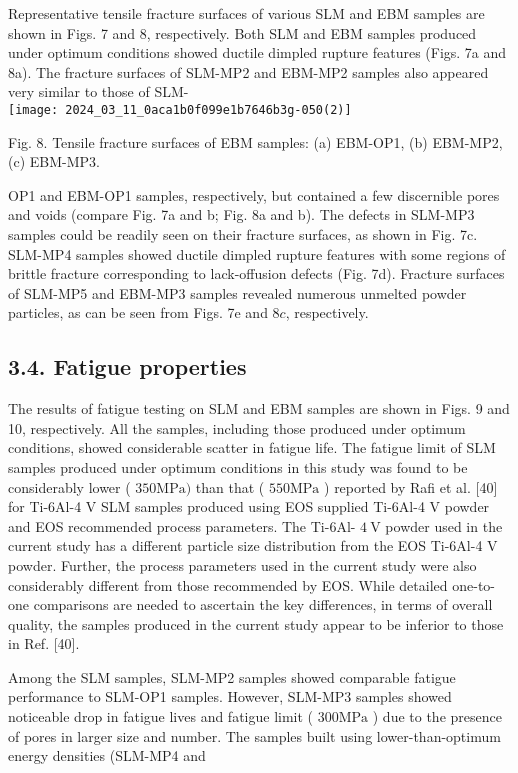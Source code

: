 \documentclass[10pt]{article}
\begin{document}
Representative tensile fracture surfaces of various SLM and EBM samples are shown in Figs. 7 and 8, respectively. Both SLM and EBM samples produced under optimum conditions showed ductile dimpled rupture features (Figs. 7a and 8a). The fracture surfaces of SLM-MP2 and EBM-MP2 samples also appeared very similar to those of SLM-\\
\texttt{[image: 2024\_03\_11\_0aca1b0f099e1b7646b3g-050(2)]}

Fig. 8. Tensile fracture surfaces of EBM samples: (a) EBM-OP1, (b) EBM-MP2, (c) EBM-MP3.

OP1 and EBM-OP1 samples, respectively, but contained a few discernible pores and voids (compare Fig. 7a and b; Fig. 8a and b). The defects in SLM-MP3 samples could be readily seen on their fracture surfaces, as shown in Fig. 7c. SLM-MP4 samples showed ductile dimpled rupture features with some regions of brittle fracture corresponding to lack-offusion defects (Fig. 7d). Fracture surfaces of SLM-MP5 and EBM-MP3 samples revealed numerous unmelted powder particles, as can be seen from Figs. 7e and $8 c$, respectively.

\subsection*{3.4. Fatigue properties}
The results of fatigue testing on SLM and EBM samples are shown in Figs. 9 and 10, respectively. All the samples, including those produced under optimum conditions, showed considerable scatter in fatigue life. The fatigue limit of SLM samples produced under optimum conditions in this study was found to be considerably lower ( $350 \mathrm{MPa})$ than that ( $550 \mathrm{MPa}$ ) reported by Rafi et al. [40] for Ti-6Al-4 V SLM samples produced using EOS supplied Ti-6Al-4 V powder and EOS recommended process parameters. The Ti-6Al- $4 \mathrm{~V}$ powder used in the current study has a different particle size distribution from the EOS Ti-6Al-4 V powder. Further, the process parameters used in the current study were also considerably different from those recommended by EOS. While detailed one-to-one comparisons are needed to ascertain the key differences, in terms of overall quality, the samples produced in the current study appear to be inferior to those in Ref. [40].

Among the SLM samples, SLM-MP2 samples showed comparable fatigue performance to SLM-OP1 samples. However, SLM-MP3 samples showed noticeable drop in fatigue lives and fatigue limit ( $300 \mathrm{MPa}$ ) due to the presence of pores in larger size and number. The samples built using lower-than-optimum energy densities (SLM-MP4 and
\end{document}
